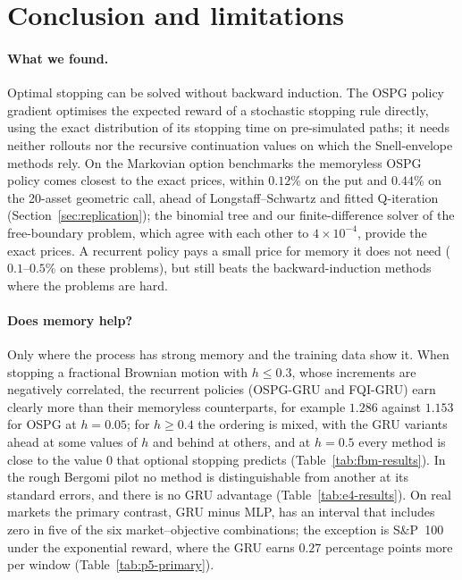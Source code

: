 \section{Conclusion and limitations}
\label{sec:conclusion}

\paragraph{What we found.}
Optimal stopping can be solved without backward induction. The OSPG policy gradient
optimises the expected reward of a stochastic stopping rule directly, using the exact
distribution of its stopping time on pre-simulated paths; it needs neither rollouts nor
the recursive continuation values on which the Snell-envelope methods rely. On the
Markovian option benchmarks the memoryless OSPG policy comes closest to the exact
prices, within $0.12\%$ on the put and $0.44\%$ on the 20-asset geometric call, ahead of
Longstaff--Schwartz and fitted Q-iteration (Section~\ref{sec:replication}); the binomial
tree and our finite-difference solver of the free-boundary problem, which agree with each
other to $4\times10^{-4}$, provide the exact prices. A recurrent policy pays a small price
for memory it does not need ($0.1$--$0.5\%$ on these problems), but still beats the
backward-induction methods where the problems are hard.

\paragraph{Does memory help?}
Only where the process has strong memory and the training data show it. When stopping a
fractional Brownian motion with $h\le0.3$, whose increments are negatively correlated, the
recurrent policies (OSPG-GRU and FQI-GRU) earn clearly more than their memoryless
counterparts, for example $1.286$ against $1.153$ for OSPG at $h=0.05$; for $h\ge0.4$ the
ordering is mixed, with the GRU variants ahead at some values of $h$ and behind at others,
and at $h=0.5$ every method is close to the value $0$ that optional stopping predicts
(Table~\ref{tab:fbm-results}). In the
rough Bergomi pilot no method is distinguishable from another at its standard errors, and
there is no GRU advantage (Table~\ref{tab:e4-results}). On real markets the primary
contrast, GRU minus MLP, has an interval that includes zero in five of the six
market--objective combinations; the exception is S\&P~100 under the exponential reward,
where the GRU earns $0.27$ percentage points more per window (Table~\ref{tab:p5-primary}).

